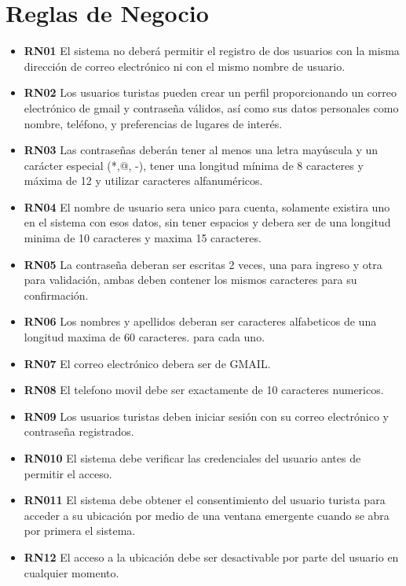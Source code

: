 \documentclass{article}
\begin{document}
\section{Reglas de Negocio}
    \begin{itemize}
    
    \item \textbf{RN01} El sistema no deberá permitir el registro de dos usuarios con la misma dirección de correo electrónico ni con el mismo nombre de usuario.
    
        \item \textbf{RN02} Los usuarios turistas pueden crear un perfil proporcionando un correo electrónico de gmail y contraseña válidos, así como sus datos personales como nombre, teléfono, y preferencias de lugares de interés.
        \item \textbf{RN03} Las contraseñas deberán tener al menos una letra mayúscula y un carácter especial (*,@, -), tener una longitud mínima de 8 caracteres y máxima de 12 y utilizar caracteres alfanuméricos.
        \item \textbf{RN04} El nombre de usuario sera unico para cuenta, solamente existira uno en el sistema con esos datos, sin tener espacios y debera ser de una longitud minima de 10 caracteres y maxima 15 caracteres.
        \item \textbf{RN05} La contraseña deberan ser escritas 2 veces, una para ingreso y otra para validación, ambas deben contener los mismos caracteres para su confirmación.
        \item \textbf{RN06} Los nombres y apellidos deberan ser caracteres alfabeticos de una longitud maxima de 60 caracteres. para cada uno.
        \item \textbf{RN07} El correo electrónico debera ser de GMAIL.
        \item \textbf{RN08} El telefono movil debe ser exactamente de 10 caracteres numericos.

    \end{itemize}

    \begin{itemize}
        \item \textbf{RN09} Los usuarios turistas deben iniciar sesión con su correo electrónico y contraseña registrados.
        \item \textbf{RN010} El sistema debe verificar las credenciales del usuario antes de permitir el acceso.
    \end{itemize}
    
    \begin{itemize}
        \item \textbf{RN011} El sistema debe obtener el consentimiento del usuario turista para acceder a su ubicación por medio de una ventana emergente cuando se abra por primera el sistema.
        \item \textbf{RN12} El acceso a la ubicación debe ser desactivable por parte del usuario en cualquier momento.
    \end{itemize}
    
\end{document}
